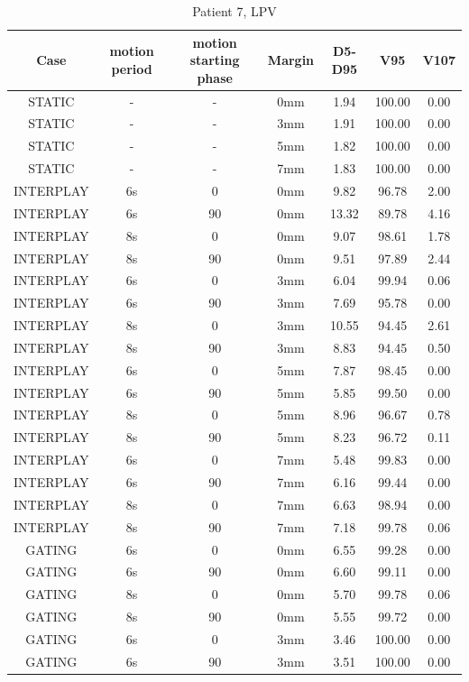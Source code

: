 \documentclass[type=dr, dr=rernat, accentcolor=tud7b,colorbacktitle, bigchapter, openright, twoside, 12pt ]{tudthesis}
\begin{document}
\begin{table}[H]
  \centering
  \caption{Patient 7, LPV}
  \begin{tabular}{|c||c|c|c||c|c|c|}
    \hline\hline
    Case & motion period & motion starting phase & Margin & D5-D95 & V95 & V107\\
    \hline 
STATIC & - & - & 0mm & 1.94 & 100.00 & 0.00 \\
STATIC & - & - & 3mm & 1.91 & 100.00 & 0.00 \\
STATIC & - & - & 5mm & 1.82 & 100.00 & 0.00 \\
STATIC & - & - & 7mm & 1.83 & 100.00 & 0.00 \\
INTERPLAY & 6s & 0 & 0mm & 9.82 & 96.78 & 2.00 \\
INTERPLAY & 6s & 90 & 0mm & 13.32 & 89.78 & 4.16 \\
INTERPLAY & 8s & 0 & 0mm & 9.07 & 98.61 & 1.78 \\
INTERPLAY & 8s & 90 & 0mm & 9.51 & 97.89 & 2.44 \\
INTERPLAY & 6s & 0 & 3mm & 6.04 & 99.94 & 0.06 \\
INTERPLAY & 6s & 90 & 3mm & 7.69 & 95.78 & 0.00 \\
INTERPLAY & 8s & 0 & 3mm & 10.55 & 94.45 & 2.61 \\
INTERPLAY & 8s & 90 & 3mm & 8.83 & 94.45 & 0.50 \\
INTERPLAY & 6s & 0 & 5mm & 7.87 & 98.45 & 0.00 \\
INTERPLAY & 6s & 90 & 5mm & 5.85 & 99.50 & 0.00 \\
INTERPLAY & 8s & 0 & 5mm & 8.96 & 96.67 & 0.78 \\
INTERPLAY & 8s & 90 & 5mm & 8.23 & 96.72 & 0.11 \\
INTERPLAY & 6s & 0 & 7mm & 5.48 & 99.83 & 0.00 \\
INTERPLAY & 6s & 90 & 7mm & 6.16 & 99.44 & 0.00 \\
INTERPLAY & 8s & 0 & 7mm & 6.63 & 98.94 & 0.00 \\
INTERPLAY & 8s & 90 & 7mm & 7.18 & 99.78 & 0.06 \\
GATING & 6s & 0 & 0mm & 6.55 & 99.28 & 0.00 \\
GATING & 6s & 90 & 0mm & 6.60 & 99.11 & 0.00 \\
GATING & 8s & 0 & 0mm & 5.70 & 99.78 & 0.06 \\
GATING & 8s & 90 & 0mm & 5.55 & 99.72 & 0.00 \\
GATING & 6s & 0 & 3mm & 3.46 & 100.00 & 0.00 \\
GATING & 6s & 90 & 3mm & 3.51 & 100.00 & 0.00 \\

\end{tabular}
\end{table}
\end{document}
